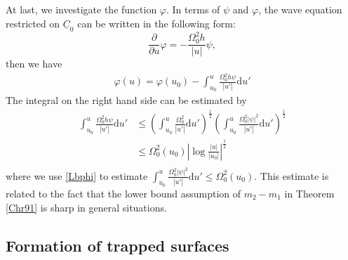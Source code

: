 \documentclass[11pt,reqno]{amsart}
\theoremstyle{definition}
\numberwithin{equation}{section}
\newcommand{\D}{\mathrm{d}}
\def\Cb{\underline{C}}
\begin{document}
At last, we investigate the function $\varphi$. In terms of $\psi$ and $\varphi$, the wave equation restricted on $\Cb_0$ can be written in the following form:
$$\frac{\partial}{\partial u}\varphi=-\frac{\Omega_0^2h}{|u|}\psi,$$
then we have
\begin{align*}
\varphi(u)=\varphi(u_0)-\int_{u_0}^{u}\frac{\Omega_0^2h\psi}{|u'|}\D u'\end{align*}
The integral on the right hand side can be estimated by
\begin{equation}\label{estimate-varphi}
\begin{split}
\int_{u_0}^{u}\frac{\Omega_0^2h\psi}{|u'|}\D u'&\leq\left(\int_{u_0}^{u}\frac{\Omega_0^2}{|u'|}\D u'\right)^{\frac{1}{2}}\left(\int_{u_0}^{u}\frac{\Omega_0^2|\psi|^2}{|u'|}\D u'\right)^{\frac{1}{2}}\\
&\leq\Omega_0^2(u_0)\left|\log{\frac{|u|}{|u_0|}}\right|^{\frac{1}{2}}\\
\end{split}
\end{equation}
where we use \eqref{Lbphi} to estimate $\int_{u_0}^{u}\frac{\Omega_0^2|\psi|^2}{|u'|}\D u'\le\Omega_0^2(u_0)$. This estimate is related to the fact that the lower bound assumption of $m_2-m_1$ in Theorem \ref{Chr91} is sharp in general situations.

\subsection{Formation of trapped surfaces}
\end{document}
